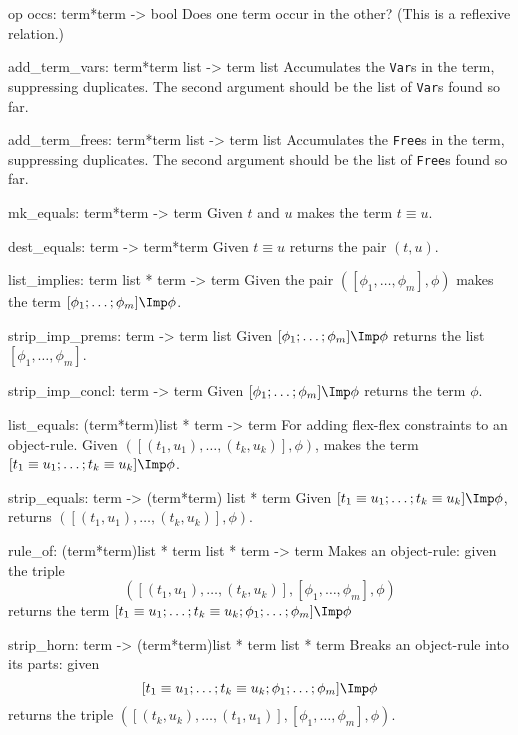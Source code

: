 \beginprog
op occs: term*term -> bool
\endprog
Does one term occur in the other?
(This is a reflexive relation.)

\beginprog
add_term_vars: term*term list -> term list
\endprog
Accumulates the {\tt Var}s in the term, suppressing duplicates.
The second argument should be the list of {\tt Var}s found so far.

\beginprog
add_term_frees: term*term list -> term list
\endprog
Accumulates the {\tt Free}s in the term, suppressing duplicates.
The second argument should be the list of {\tt Free}s found so far.

\beginprog
mk_equals: term*term -> term
\endprog
Given $t$ and $u$ makes the term $t\equiv u$.

\beginprog
dest_equals: term -> term*term
\endprog
Given $t\equiv u$ returns the pair $(t,u)$.

\beginprog
list_implies: term list * term -> term
\endprog
Given the pair $([\phi_1,\ldots, \phi_m], \phi)$
makes the term \([\phi_1;\ldots; \phi_m] \Imp \phi\).

\beginprog
strip_imp_prems: term -> term list
\endprog
Given \([\phi_1;\ldots; \phi_m] \Imp \phi\)
returns the list \([\phi_1,\ldots, \phi_m]\). 

\beginprog
strip_imp_concl: term -> term
\endprog
Given \([\phi_1;\ldots; \phi_m] \Imp \phi\)
returns the term \(\phi\). 

\beginprog
list_equals: (term*term)list * term -> term
\endprog
For adding flex-flex constraints to an object-rule. 
Given $([(t_1,u_1),\ldots, (t_k,u_k)], \phi)$,
makes the term \([t_1\equiv u_1;\ldots; t_k\equiv u_k]\Imp \phi\).

\beginprog
strip_equals: term -> (term*term) list * term
\endprog
Given \([t_1\equiv u_1;\ldots; t_k\equiv u_k]\Imp \phi\),
returns $([(t_1,u_1),\ldots, (t_k,u_k)], \phi)$.

\beginprog
rule_of: (term*term)list * term list * term -> term
\endprog
Makes an object-rule: given the triple
\[ ([(t_1,u_1),\ldots, (t_k,u_k)], [\phi_1,\ldots, \phi_m], \phi) \]
returns the term
\([t_1\equiv u_1;\ldots; t_k\equiv u_k; \phi_1;\ldots; \phi_m]\Imp \phi\)

\beginprog
strip_horn: term -> (term*term)list * term list * term
\endprog
Breaks an object-rule into its parts: given
\[ [t_1\equiv u_1;\ldots; t_k\equiv u_k; \phi_1;\ldots; \phi_m] \Imp \phi \]
returns the triple
\(([(t_k,u_k),\ldots, (t_1,u_1)], [\phi_1,\ldots, \phi_m], \phi).\)


